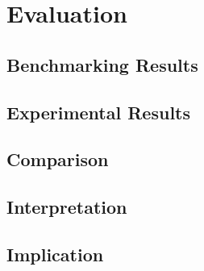 \chapter{Evaluation}

\label{Evaluation} %


\section{Benchmarking Results}

\section{Experimental Results}

\section{Comparison}

\section{Interpretation}

\section{Implication}
